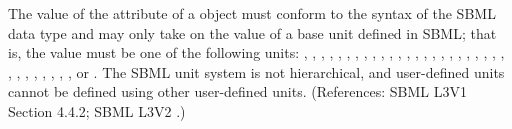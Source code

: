 The value of the attribute  of a \Unit object must conform to
the syntax of the SBML data type  and may only take on
the value of a base unit defined in SBML; that is, the value must be one of
the following units:
,
,
,
,
,
,
,
,
,
,
,
,
,
,
,
,
,
,
,
,
,
,
,
,
,
,
,
,
,
,
,
, or
.
The SBML unit system is not hierarchical, and user-defined units cannot be
defined using other user-defined units.  (References: SBML L3V1 Section 4.4.2; SBML L3V2
.)
